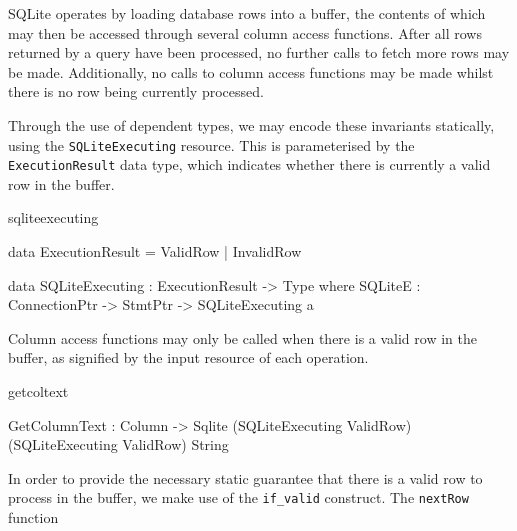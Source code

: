 SQLite operates by loading database rows into a buffer, the contents of which may then be accessed through several column access functions. After all rows returned by a query have been processed, no further calls to fetch more rows may be made. Additionally, no calls to column access functions may be made whilst there is no row being currently processed. 

Through the use of dependent types, we may encode these invariants statically, using the \texttt{SQLiteExecuting} resource. This is parameterised by the \texttt{ExecutionResult} data type, which indicates whether there is currently a valid row in the buffer.

\begin{SaveVerbatim}{sqliteexecuting}

data ExecutionResult = ValidRow
                     | InvalidRow

data SQLiteExecuting : ExecutionResult -> Type where
  SQLiteE : ConnectionPtr -> 
            StmtPtr -> SQLiteExecuting a
  
\end{SaveVerbatim}

Column access functions may only be called when there is a valid row in the buffer, as signified by the input resource of each operation.

\begin{SaveVerbatim}{getcoltext}

GetColumnText : Column -> 
                Sqlite (SQLiteExecuting ValidRow) 
                       (SQLiteExecuting ValidRow)
                       String
                         
\end{SaveVerbatim}

\noindent
In order to provide the necessary static guarantee that there is a valid row to process in the buffer, we make use of the \texttt{if\_valid} construct. The \texttt{nextRow} function 

